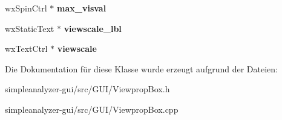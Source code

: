 \begin{DoxyCompactItemize}
\item 
\hypertarget{classViewpropBox_a797f04c5a5ff51c896c5b1c8a767f39e}{wx\-Spin\-Ctrl $\ast$ {\bfseries max\-\_\-visval}}\label{classViewpropBox_a797f04c5a5ff51c896c5b1c8a767f39e}

\item 
\hypertarget{classViewpropBox_a375ca0568e549c60a3c161eee4e207fb}{wx\-Static\-Text $\ast$ {\bfseries viewscale\-\_\-lbl}}\label{classViewpropBox_a375ca0568e549c60a3c161eee4e207fb}

\item 
\hypertarget{classViewpropBox_a2bb76356eccd2b73ec70630e67ff33ba}{wx\-Text\-Ctrl $\ast$ {\bfseries viewscale}}\label{classViewpropBox_a2bb76356eccd2b73ec70630e67ff33ba}

\end{DoxyCompactItemize}


Die Dokumentation für diese Klasse wurde erzeugt aufgrund der Dateien\-:\begin{DoxyCompactItemize}
\item 
simpleanalyzer-\/gui/src/\-G\-U\-I/Viewprop\-Box.\-h\item 
simpleanalyzer-\/gui/src/\-G\-U\-I/Viewprop\-Box.\-cpp\end{DoxyCompactItemize}
